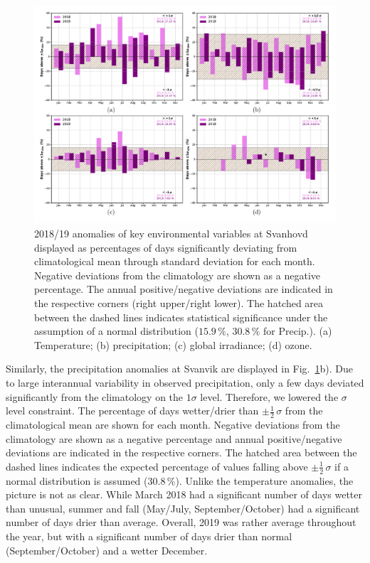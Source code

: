 \documentclass[bg, manuscript]{copernicus}
\begin{document}
\begin{figure}[t]
  \includegraphics[width=12cm]{fig08}
  \caption{2018/19 anomalies of key environmental variables at Svanhovd displayed as percentages of days significantly deviating from climatological mean through standard deviation for each month. Negative deviations from the climatology are shown as a negative percentage. The annual positive/negative deviations are indicated in the respective corners (right upper/right lower). The hatched area between the dashed lines indicates statistical significance under the assumption of a normal distribution ($15.9\,\unit{\%}$, $30.8\,\unit{\%}$ for Precip.). (a) Temperature; (b) precipitation; (c) global irradiance; (d) ozone.}
  \label{fig:anomalies_svanvik}
\end{figure}

Similarly, the precipitation anomalies at Svanvik are displayed in Fig.~\ref{fig:anomalies_svanvik}b). Due to large interannual variability in observed precipitation, only a few days deviated significantly from the climatology on the $1 \sigma$ level. Therefore, we lowered the $\sigma$ level constraint. The percentage of days wetter/drier than $\pm \frac{1}{2}\,\sigma$ from the climatological mean are shown for each month. Negative deviations from the climatology are shown as a negative percentage and annual positive/negative deviations are indicated in the respective corners. The hatched area between the dashed lines indicates the expected percentage of values falling above $\pm\frac{1}{2}\,\sigma$ if a normal distribution is assumed ($30.8\,\unit{\%}$). Unlike the temperature anomalies, the picture is not as clear. While March 2018 had a significant number of days wetter than unusual, summer and fall (May/July, September/October) had a significant number of days drier than average. Overall, 2019 was rather average throughout the year, but with a significant number of days drier than normal (September/October) and a wetter December.
\end{document}
